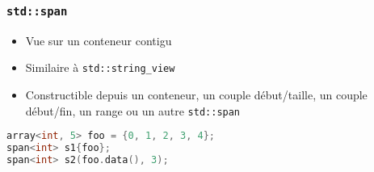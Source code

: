 \documentclass[C++.tex]{subfiles}
\begin{document}
\begin{frame}[fragile]
	\frametitle{\lstinline|std::span|}
	\begin{itemize}
		\item Vue sur un conteneur contigu
		\item Similaire à \lstinline|std::string_view|
		\item Constructible depuis un conteneur, un couple début/taille, un couple début/fin, un range ou un autre \lstinline|std::span|
	\end{itemize}

	\begin{lstlisting}[language=C++]
array<int, 5> foo = {0, 1, 2, 3, 4};
span<int> s1{foo};
span<int> s2(foo.data(), 3);\end{lstlisting}
\end{frame}
\end{document}
